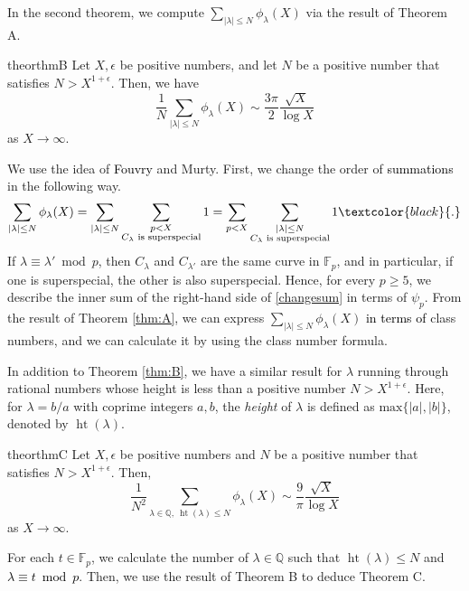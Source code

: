\documentclass[a4paper, 11pt]{article}
\theoremstyle{plain}
\newcommand{\?}{\textcolor{red}{??}}
\newcommand{\lm}{\lambda}
\newcommand{\llm}{{\lambda}'}
\newcommand{\fp}{\mathbb{F}_p}
\newcommand{\bQ}{\mathbb{Q}}
\newcommand{\height}{\operatorname{ht}}
\begin{document}
In the second theorem, we compute $\sum_{\lvert \lm \rvert \le N} {\phi}_{\lm}(X)$ via the result of Theorem A. 
\begin{restatable}{theor}{thmB} \label{thm:B}
    Let $X,\epsilon$ be positive numbers, and let $N$ be a positive number that satisfies $N > X^{1+\epsilon}$. Then, we have
    \[
   \frac{1}{N} \sum_{\lvert \lm \rvert \le N} {\phi}_{\lm}(X) \sim \frac{3\pi}{2} \frac{\sqrt{X}}{\log X} 
    \]
    as $X \rightarrow \infty$.
\end{restatable}

We use the idea of \textcolor{black}{Fouvry} and Murty. First, we change the order of \textcolor{black}{summations} in the following way.
\begin{eqnarray}
\label{changesum}
\sum_{|\lm| \le N} {\phi}_{\lm}(X) =  \sum_{|\lm| \le N} \sum_{\substack{p < X \\  C_{\lm} \text{ is superspecial} }} 1 
= \sum_{p < X} \sum_{\substack{|\lm| \le N \\ C_{\lm} \text{ is superspecial} }} 1 \textcolor{black}{.}
\end{eqnarray}
If $\lm \equiv \llm \bmod p$, then $C_{\lm}$ and $C_{\llm}$ are the same curve in $\fp$, and in particular, if one is superspecial, the other is also superspecial. Hence, for every $p \ge 5$, we describe
the inner sum of the right-hand side of \eqref{changesum} in terms of ${\psi}_p$.
From the result of Theorem \ref{thm:A}, we can express $\sum_{|\lm| \le N} {\phi}_{\lm}(X)$ \textcolor{black}{in terms of} class numbers, and we can calculate it by using the class number formula.

In addition to Theorem \ref{thm:B}, we have a similar result for $\lm$ running through rational numbers whose height is less than a 
 positive number $N > X^{1+ \epsilon}$. Here, for $\lm = b/a$ with coprime integers $a,b$, the \textit{height} of $\lm$ is defined as
 $\text{max}\{|a|,|b|\}$, denoted by $\height(\lm)$.   

 \begin{restatable}{theor}{thmC} \label{thm:C}
      Let $X,\epsilon$ be positive numbers and $N$ be a positive number that satisfies $N > X^{1+\epsilon}$. Then,
    \[
   \frac{1}{N^2} \sum_{\lm \in \bQ,\ \height(\lm) \le N } {\phi}_{\lm}(X) \sim \frac{9}{\pi} \frac{\sqrt{X}}{\log X} 
    \]
    as $X \rightarrow \infty$.
 \end{restatable}
 
For each $t \in \fp$, we calculate the number of $\lm \in \bQ $ such that $\height(\lm) \le N$ and \textcolor{black}{$\lm \equiv t \bmod p$}. Then, we use the result of Theorem B to deduce Theorem C.
\end{document}
